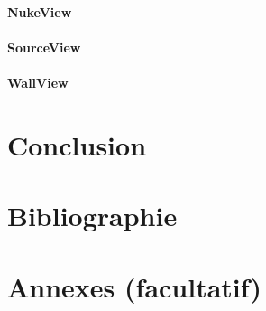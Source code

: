 \documentclass[]{article}
\begin{document}
\paragraph{NukeView}

\paragraph{SourceView}

\paragraph{WallView}

\section{Conclusion}

\section{Bibliographie}

\section{Annexes (facultatif)}
\end{document}
